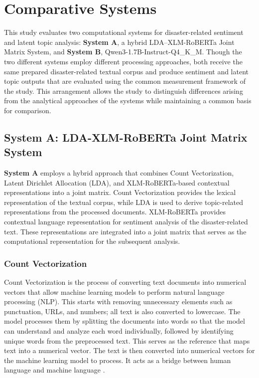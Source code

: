 \documentclass[12pt,a4paper]{report}
\newcommand{\sysA}{\textbf{System A}}
\newcommand{\sysB}{\textbf{System B}}
\newcommand{\xlmr}{XLM-RoBERTa}
\begin{document}
\section{Comparative Systems}

This study evaluates two computational systems for disaster-related sentiment
and latent topic analysis: \sysA, a hybrid LDA--\xlmr{} Joint Matrix System, and
\sysB, Qwen3-1.7B-Instruct-Q4\_K\_M. Though the two different systems employ different processing
approaches, both receive the same prepared disaster-related textual corpus and
produce sentiment and latent topic outputs that are evaluated using the common
measurement framework of the study. This arrangement allows the study to
distinguish differences arising from the analytical approaches of the systems
while maintaining a common basis for comparison.

\subsection{System A: LDA-XLM-RoBERTa Joint Matrix System}

\sysA{} employs a hybrid approach that combines Count Vectorization, Latent
Dirichlet Allocation (LDA), and \xlmr-based contextual representations into a
joint matrix. Count Vectorization provides the lexical representation of the
textual corpus, while LDA is used to derive topic-related representations from
the processed documents. \xlmr{} provides contextual language representation
for sentiment analysis of the disaster-related text. These representations are
integrated into a joint matrix that serves as the computational representation
for the subsequent analysis.

\subsubsection{Count Vectorization}

Count Vectorization is the process of converting text documents into numerical
vectors that allow machine learning models to perform natural language
processing (NLP). This starts with removing unnecessary elements such as
punctuation, URLs, and numbers; all text is also converted to lowercase. The
model processes them by splitting the documents into words so that the model
can understand and analyze each word individually, followed by identifying
unique words from the preprocessed text. This serves as the reference that maps
text into a numerical vector. The text is then converted into numerical vectors
for the machine learning model to process. It acts as a bridge between human
language and machine language \parencite{kozhevnikov2020}.
\end{document}
